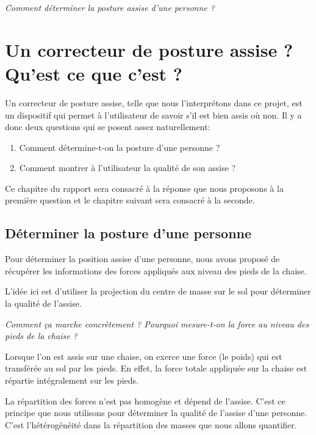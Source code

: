 \documentclass{polytech/polytech}
\begin{document}
\begin{center}
\textit{Comment déterminer la posture assise d'une personne ? }
\end{center}

\chapter{Un correcteur de posture assise ? Qu'est ce que c'est ?}

Un correcteur de posture assise, telle que nous l'interprétons dans ce projet, est un dispositif qui permet à l'utilisateur de savoir s'il est bien assis où non.
 Il y a donc deux questions qui se posent assez naturellement:

\begin{enumerate}
\item Comment détermine-t-on la posture d'une personne ?
\item Comment montrer à l'utilisateur la qualité de son assise ?
\end{enumerate}

Ce chapitre du rapport sera consacré à la réponse que nous proposons à la première question et le chapitre suivant sera consacré à la seconde.

\section{Déterminer la posture d'une personne}
\label{chap:posture_determination}

Pour déterminer la position assise d'une personne, nous avons proposé de récupérer les informations des forces appliqués aux niveau des pieds de la chaise. 

L'idée ici est d'utiliser la projection du centre de masse sur le sol pour déterminer la qualité de l'assise. 

\begin{center}
\textit{Comment ça marche concrètement ? Pourquoi mesure-t-on la force au niveau des pieds de la chaise ?} 
\end{center}

Lorsque l'on est assis sur une chaise, on exerce une force (le poids) qui est transférée au sol par les pieds. En effet, la force totale appliquée sur la chaise est répartie intégralement sur les pieds.

La répartition des forces n'est pas homogène et dépend de l'assise. 
C'est ce principe que nous utilisons pour déterminer la qualité de l'assise d'une personne. 
C'est l'hétérogénéité dans la répartition des masses que nous allons quantifier.
\end{document}

